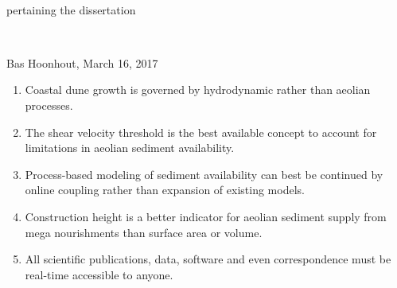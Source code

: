 \documentclass[headinclude,footinclude,cleardoublepage=empty,
numbers=noenddot,fontsize=9pt]{scrbook}
\begin{document}
\pagestyle{plain}

\begin{titlepage}
  \begin{center}
    \hfill
    \vfill
    
    \begingroup
    \color{Maroon} \\ \bigskip
    \endgroup

    pertaining the dissertation \\ \bigskip

    \begingroup
    \color{Maroon} \\ \bigskip
    \endgroup
    
    Bas Hoonhout, March 16, 2017
  \end{center}  

  \vfill
    
  \begin{enumerate}


  \item Coastal dune growth is governed by hydrodynamic rather than
    aeolian processes.

  \item The shear velocity threshold is the best available concept to
    account for limitations in aeolian sediment availability.

  \item Process-based modeling of sediment availability can best be
    continued by online coupling rather than expansion of existing
    models.

  \item Construction height is a better indicator for aeolian sediment
    supply from mega nourishments than surface area or volume.

  \item All scientific publications, data, software and even
    correspondence must be real-time accessible to anyone.


\end{enumerate}
\end{titlepage}
\end{document}
